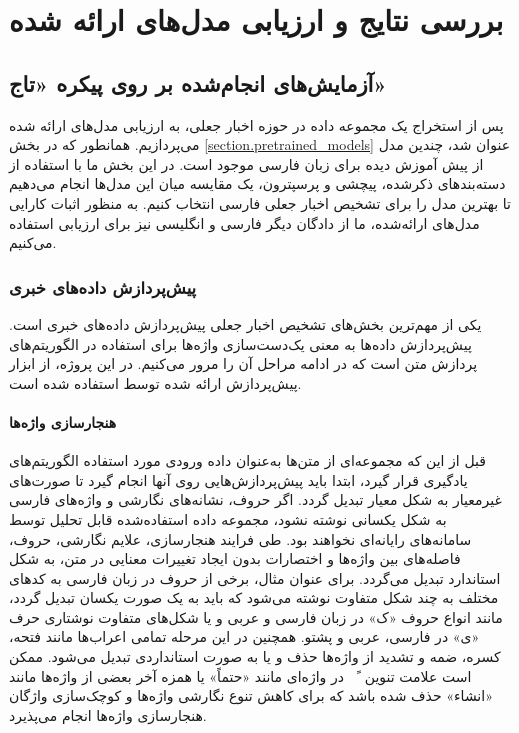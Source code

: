 \chapter{بررسی نتایج و ارزیابی مدل‌های ارائه شده}


\section{آزمایش‌های انجام‌شده بر روی پیکره «تاج»}
پس از استخراج یک مجموعه داده در حوزه اخبار جعلی، به ارزیابی مدل‌های ارائه شده می‌پردازیم. همانطور که در بخش \ref{section.pretrained_models} عنوان شد، چندین مدل از پیش آموزش‌ دیده برای زبان‌ فارسی موجود است. در این بخش ما با استفاده از دسته‌بند‌های ذکرشده، پیچشی و پرسپترون، یک مقایسه میان این مدل‌ها انجام می‌دهیم تا بهترین مدل‌ را برای تشخیص اخبار جعلی فارسی انتخاب کنیم. به منظور اثبات کارایی مدل‌های ارائه‌شده، ما از دادگان دیگر فارسی و انگلیسی نیز برای ارزیابی استفاده می‌کنیم.

\subsection{پیش‌پردازش داده‌های خبری}
یکی از مهم‌ترین بخش‌های تشخیص اخبار جعلی پیش‌پردازش داده‌های خبری است. پیش‌پردازش داده‌ها به معنی یک‌دست‌سازی واژه‌ها برای استفاده در الگوریتم‌های پردازش متن است که در ادامه مراحل آن را مرور می‌کنیم. در این پروژه، از ابزار پیش‌پردازش ارائه شده توسط \cite{Thesis_abdolah} استفاده شده است.


\subsubsection[هنجارسازی واژه‌ها]{هنجارسازی واژه‌ها}
قبل از این که مجموعه‌ای از متن‌ها به‌عنوان داده ورودی مورد استفاده الگوریتم‌های یادگیری قرار گیرد،  ابتدا باید پیش‌پردازش‌هایی روی آنها انجام گیرد تا صورت‌های غیرمعیار به شکل معیار تبدیل گردد. اگر حروف، نشانه‌های نگارشی و واژه‌های فارسی به شکل یکسانی نوشته نشود، مجموعه داده استفاده‌شده قابل تحلیل توسط سامانه‌های رایانه‌ای نخواهند بود. طی فرایند هنجارسازی، علایم نگارشی، حروف، فاصله‌های بین واژه‌ها و اختصارات  بدون ایجاد تغییرات معنایی در متن، به شکل استاندارد تبدیل می‌گردد. برای عنوان مثال، برخی از حروف در زبان فارسی به کدهای مختلف به چند شکل متفاوت نوشته می‌شود که باید به یک صورت یکسان تبدیل گردد، مانند انواع حروف «ک» در زبان فارسی و عربی و یا شکل‌های متفاوت نوشتاری حرف «ی» در فارسی، عربی و پشتو. همچنین در این مرحله تمامی اعراب‌ها مانند فتحه، کسره، ضمه  و تشدید از واژه‌ها حذف و یا به صورت استانداردی تبدیل می‌شود. ممکن است  علامت تنوین  ~ً~ در واژه‌ای مانند «حتماً» یا همزه آخر بعضی از واژه‌ها مانند «انشاء» حذف  شده باشد که برای کاهش تنوع نگارشی واژه‌ها و کوچک‌‌سازی واژگان هنجارسازی واژه‌ها انجام می‌پذیرد.


